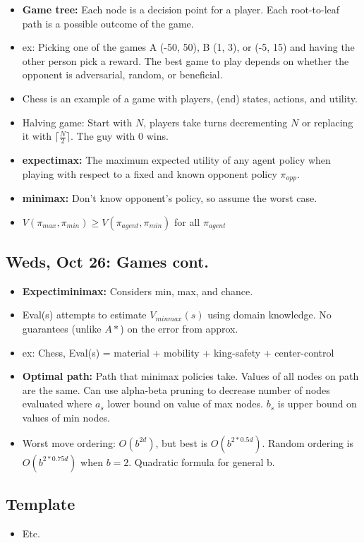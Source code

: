 \documentclass[10pt, oneside]{article}
\begin{document}
\begin{itemize}

\item \textbf{Game tree:} Each node is a decision point for a player. Each root-to-leaf path is a possible outcome of the game.

\item ex: Picking one of the games A (-50, 50), B (1, 3), or (-5, 15) and having the other person pick a reward. The best game to play depends on whether the opponent is adversarial, random, or beneficial.

\item Chess is an example of a game with players, (end) states, actions, and utility.

\item Halving game: Start with $N$, players take turns decrementing $N$ or replacing it with $\lceil \frac{N}{2} \rceil$. The guy with 0 wins.

\item \textbf{expectimax:} The maximum expected utility of any agent policy when playing with respect to a fixed and known opponent policy $\pi_{opp}$.

\item \textbf{minimax:} Don't know opponent's policy, so assume the worst case.

\item $V(\pi_{max}, \pi_{min}) \geq V(\pi_{agent}, \pi_{min})$ for all $\pi_{agent}$
\end{itemize}

\subsection{Weds, Oct 26: Games cont.}

\begin{itemize}

\item \textbf{Expectiminimax:} Considers min, max, and chance.

\item Eval(s) attempts to estimate $V_{minmax}(s)$ using domain knowledge. No guarantees (unlike $A*$) on the error from approx.

\item ex: Chess, Eval(s) = material + mobility + king-safety + center-control

\item \textbf{Optimal path:} Path that minimax policies take. Values of all nodes on path are the same. Can use alpha-beta pruning to decrease number of nodes evaluated where $a_s$ lower bound on value of max nodes. $b_s$ is upper bound on values of min nodes.

\item Worst move ordering: $O(b^{2d})$, but best is $O(b^{2*0.5d})$. Random ordering is $O(b^{2*0.75d})$ when $b = 2$. Quadratic formula for general b.
\end{itemize}

\subsection{Template}

\begin{itemize}

\item Etc.

\end{itemize}
\end{document}
